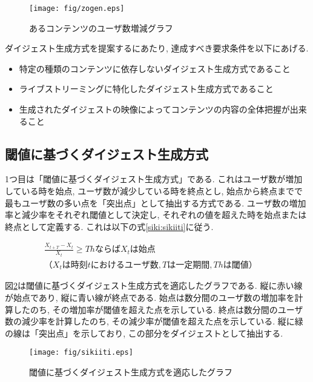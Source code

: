 \begin{figure}[h]
  \centering
  \texttt{[image: fig/zogen.eps]}
  \caption{あるコンテンツのユーザ数増減グラフ}
  \label{fig:zogen}
\end{figure}

ダイジェスト生成方式を提案するにあたり, 達成すべき要求条件を以下にあげる.

\begin{itemize}
\item 特定の種類のコンテンツに依存しないダイジェスト生成方式であること
\item ライブストリーミングに特化したダイジェスト生成方式であること
\item 生成されたダイジェストの映像によってコンテンツの内容の全体把握が出来ること
\end{itemize}

\newpage

\subsection{閾値に基づくダイジェスト生成方式}
1つ目は「閾値に基づくダイジェスト生成方式」である. これはユーザ数が増加している時を始点, ユーザ数が減少している時を終点とし, 始点から終点までで最もユーザ数の多い点を「突出点」として抽出する方式である. ユーザ数の増加率と減少率をそれぞれ閾値として決定し, それぞれの値を超えた時を始点または終点として定義する. これは以下の式\ref{siki:sikiiti}に従う.

\begin{eqnarray}
\frac{X_{t+T}-X_{t}}{X_{t}} \geq ThならばX_{t}は始点 \nonumber \\
（X_{t}は時刻tにおけるユーザ数,Tは一定期間, Thは閾値）&&
\label{siki:sikiiti}
\end{eqnarray}

図\ref{fig:sikiiti}は閾値に基づくダイジェスト生成方式を適応したグラフである. 縦に赤い線が始点であり, 縦に青い線が終点である. 始点は数分間のユーザ数の増加率を計算したのち, その増加率が閾値を超えた点を示している. 終点は数分間のユーザ数の減少率を計算したのち, その減少率が閾値を超えた点を示している. 縦に緑の線は「突出点」を示しており, この部分をダイジェストとして抽出する.

\begin{figure}[h]
  \centering
  \texttt{[image: fig/sikiiti.eps]}
  \caption{閾値に基づくダイジェスト生成方式を適応したグラフ}
  \label{fig:sikiiti}
\end{figure}

\newpage

